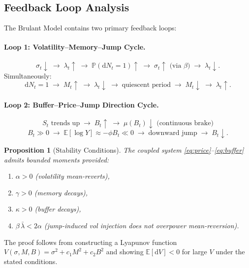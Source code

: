 \documentclass[11pt,a4paper]{article}
\newtheorem{proposition}[theorem]{Proposition}
\newcommand{\E}{\mathbb{E}}
\newcommand{\Prob}{\mathbb{P}}
\newcommand{\diff}{\mathrm{d}}
\begin{document}
\subsection{Feedback Loop Analysis}
\label{sec:feedback}

The Brulant Model contains two primary feedback loops:

\paragraph{Loop 1: Volatility--Memory--Jump Cycle.}
\[
  \sigma_t \downarrow \;\longrightarrow\; \lambda_t \uparrow
  \;\longrightarrow\; \Prob(\diff N_t = 1) \uparrow
  \;\longrightarrow\; \sigma_t \uparrow \text{ (via $\beta$)}
  \;\longrightarrow\; \lambda_t \downarrow.
\]
Simultaneously:
\[
  \diff N_t = 1 \;\longrightarrow\; M_t \uparrow
  \;\longrightarrow\; \lambda_t \downarrow
  \;\longrightarrow\; \text{quiescent period}
  \;\longrightarrow\; M_t \downarrow
  \;\longrightarrow\; \lambda_t \uparrow.
\]

\paragraph{Loop 2: Buffer--Price--Jump Direction Cycle.}
\[
  S_t \text{ trends up} \;\longrightarrow\; B_t \uparrow
  \;\longrightarrow\; \mu(B_t) \downarrow \text{ (continuous brake)}
\]
\[
  B_t \gg 0 \;\longrightarrow\; \E[\log Y] \approx -\phi B_t \ll 0
  \;\longrightarrow\; \text{downward jump}
  \;\longrightarrow\; B_t \downarrow.
\]

\begin{proposition}[Stability Conditions]
\label{prop:stability}
The coupled system \eqref{eq:price}--\eqref{eq:buffer} admits bounded
moments provided:
\begin{enumerate}[nosep]
  \item $\alpha > 0$ (volatility mean-reverts),
  \item $\gamma > 0$ (memory decays),
  \item $\kappa > 0$ (buffer decays),
  \item $\beta\,\bar{\lambda} < 2\alpha$ (jump-induced vol injection
    does not overpower mean-reversion).
\end{enumerate}
\end{proposition}

The proof follows from constructing a Lyapunov function
$V(\sigma, M, B) = \sigma^2 + c_1 M^2 + c_2 B^2$ and showing
$\E[\diff V] < 0$ for large $V$ under the stated conditions.
\end{document}
